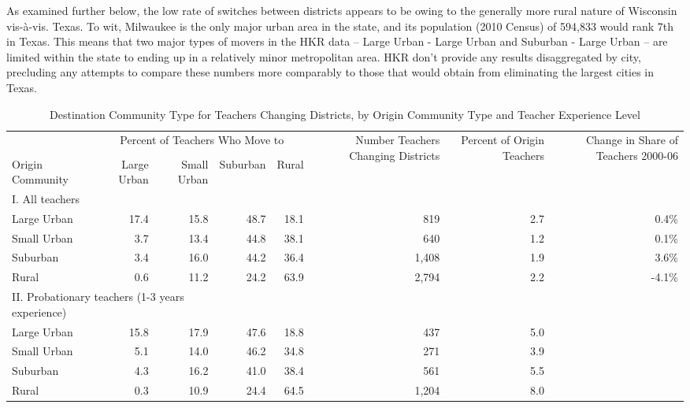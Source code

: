 \documentclass[12pt,]{article}
\begin{document}
As examined further below, the low rate of switches between districts
appears to be owing to the generally more rural nature of Wisconsin
vis-à-vis. Texas. To wit, Milwaukee is the only major urban area in the
state, and its population (2010 Census) of 594,833 would rank 7th in
Texas. This means that two major types of movers in the HKR data --
Large Urban - Large Urban and Suburban - Large Urban -- are limited
within the state to ending up in a relatively minor metropolitan area.
HKR don't provide any results disaggregated by city, precluding any
attempts to compare these numbers more comparably to those that would
obtain from eliminating the largest cities in Texas.

\begin{sidewaystable}[htbp]
\centering
\begin{tabular}{lrrrrrrr}
  \hline
 & \multicolumn{4}{c}{\multirow{2}{*}{Percent of Teachers Who Move to}} & \multirow{4}{*}{\parbox{0.09\linewidth}{Number Teachers Changing Districts}} & \multirow{4}{*}{\parbox{0.07\linewidth}{Percent of Origin Teachers}} & \multirow{4}{*}{\parbox{0.09\linewidth}{Change in Share of Teachers 2000-06}}\\
 & \multicolumn{4}{c}{} & & & \\ \cline{2-5}
& & & & & & & \\
Origin Community & Large Urban & Small Urban & Suburban & Rural &  &  &  \\ 
  \hline
I. All teachers & & & & & & & \\
\quad Large Urban & 17.4 & 15.8 & 48.7 & 18.1 & 819 & 2.7 & 0.4\% \\ 
  \quad Small Urban & 3.7 & 13.4 & 44.8 & 38.1 & 640 & 1.2 & 0.1\% \\ 
  \quad Suburban & 3.4 & 16.0 & 44.2 & 36.4 & 1,408 & 1.9 & 3.6\% \\ 
  \quad Rural & 0.6 & 11.2 & 24.2 & 63.9 & 2,794 & 2.2 & -4.1\% \\ 
\multicolumn{3}{l}{II. Probationary teachers (1-3 years experience)} & & & & & \\
  \quad Large Urban & 15.8 & 17.9 & 47.6 & 18.8 & 437 & 5.0 &  \\ 
  \quad Small Urban & 5.1 & 14.0 & 46.2 & 34.8 & 271 & 3.9 &  \\ 
  \quad Suburban & 4.3 & 16.2 & 41.0 & 38.4 & 561 & 5.5 &  \\ 
  \quad Rural & 0.3 & 10.9 & 24.4 & 64.5 & 1,204 & 8.0 &  \\ 
   \hline
\end{tabular}
\caption{Destination Community Type for Teachers Changing Districts, by Origin Community Type and Teacher Experience Level} 
\label{tbl:markov}
\end{sidewaystable}
\end{document}
